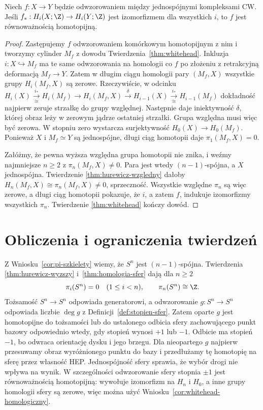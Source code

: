 \begin{wniosek}
\label{cor:whitehead-homologiczny}
Niech $f:X\to Y$ będzie odwzorowaniem
między jednospójnymi
kompleksami CW.
Jeśli
$f_*:H_i(X;\Z)\to H_i(Y;\Z)$
jest izomorfizmem
dla wszystkich $i$,
to $f$ jest
równoważnością
homotopijną.
\end{wniosek}
\begin{proof}
Zastępujemy $f$
odwzorowaniem komórkowym
homotopijnym z nim
i tworzymy cylinder
$M_f$ z dowodu
Twierdzenia~\ref{thm:whitehead}.
Inkluzja
$i:X\hookrightarrow M_f$
ma te same odwzorowania
na homologii co $f$
po złożeniu z
retrakcyjną deformacją
$M_f\to Y$.
Zatem w długim
ciągu homologii
pary $(M_f,X)$
wszystkie grupy
$H_i(M_f,X)$
są zerowe.
Rzeczywiście, w odcinku
$H_i(X)\xrightarrow[\cong]{i_*}H_i(M_f)\to H_i(M_f,X)
\xrightarrow{\delta}H_{i-1}(X)\xrightarrow[\cong]{i_*}H_{i-1}(M_f)$
dokładność najpierw zeruje strzałkę do grupy względnej.
Następnie daje iniektywność $\delta$, której obraz leży w zerowym
jądrze ostatniej strzałki. Grupa względna musi więc być zerowa.
W stopniu zero wystarcza surjektywność $H_0(X)\to H_0(M_f)$.
Ponieważ $X$
i $M_f\simeq Y$
są jednospójne,
długi ciąg homotopii
daje
$\pi_1(M_f,X)=0$.

Załóżmy, że pewna
wyższa względna
grupa homotopii
nie znika, i weźmy
najmniejsze $n\geq2$
z $\pi_n(M_f,X)\ne0$.
Para jest wtedy
$(n-1)$-spójna,
a $X$ jednospójna.
Twierdzenie
\ref{thm:hurewicz-wzgledny}
dałoby
$H_n(M_f,X)\cong
\pi_n(M_f,X)\ne0$,
sprzeczność.
Wszystkie względne
$\pi_n$ są więc
zerowe, a długi
ciąg homotopii
pokazuje, że
$i$, a zatem $f$,
indukuje izomorfizmy
wszystkich $\pi_n$.
Twierdzenie
\ref{thm:whitehead}
kończy dowód.
\end{proof}

\section{Obliczenia i ograniczenia twierdzeń}
\label{sec:pi-przyklady}

\begin{przyklad}
\label{prz:pi-sfera-hurewicz}
Z Wniosku~\ref{cor:pi-szkielety}
wiemy, że $S^n$
jest $(n-1)$-spójna.
Twierdzenia
\ref{thm:hurewicz-wyzszy}
i~\ref{thm:homologia-sfer}
dają dla $n\geq2$
\[
 \pi_i(S^n)=0\quad(1\leq i<n),
 \qquad
 \pi_n(S^n)\cong\Z.
\]
Tożsamość $S^n\to S^n$
odpowiada generatorowi,
a odwzorowanie $g:S^n\to S^n$
odpowiada liczbie
$\deg g$ z
Definicji~\ref{def:stopien-sfer}.
Zatem oparte $g$ jest homotopijne do tożsamości lub do ustalonego
odbicia sfery zachowującego punkt bazowy odpowiednio wtedy,
gdy stopień wynosi $+1$ lub $-1$.
Odbicie ma stopień $-1$, bo odwraca orientację dysku i jego brzegu.
Dla nieopartego $g$ najpierw przesuwamy obraz wyróżnionego punktu do bazy
i przedłużamy tę homotopię na sferę przez własność HEP.
Jednospójność sfery sprawia, że wybór drogi nie wpływa na wynik. W szczególności
odwzorowanie sfery stopnia
$\pm1$ jest
równoważnością
homotopijną:
wywołuje izomorfizm
na $H_n$ i $H_0$,
a inne grupy homologii
sfery są zerowe,
więc można użyć
Wniosku~\ref{cor:whitehead-homologiczny}.
\end{przyklad}


